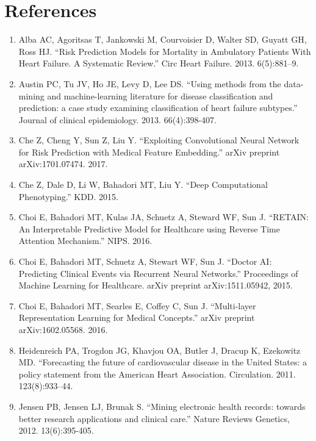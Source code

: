 \documentclass[11pt]{article}
\begin{document}
	\section{References}
	\label{sec:references}
	\begin{enumerate}
		\item Alba AC, Agoritsas T, Jankowski M, Courvoisier D, Walter SD, Guyatt GH, Ross HJ. “Risk Prediction Models for Mortality in Ambulatory Patients With Heart Failure. A Systematic Review.” Circ Heart Failure. 2013. 6(5):881–9.
		
		\item Austin PC, Tu JV, Ho JE, Levy D, Lee DS. “Using methods from the data-mining and machine-learning literature for disease classification and prediction: a case study examining classification of heart failure subtypes.” Journal of clinical epidemiology. 2013. 66(4):398-407.
		
		\item Che Z, Cheng Y, Sun Z, Liu Y. “Exploiting Convolutional Neural Network for Risk Prediction with Medical Feature Embedding.” arXiv preprint arXiv:1701.07474. 2017.
		
		\item Che Z, Dale D, Li W, Bahadori MT, Liu Y. “Deep Computational Phenotyping.” KDD. 2015.
		
		\item Choi E, Bahadori MT, Kulas JA, Schuetz A, Steward WF, Sun J. “RETAIN: An Interpretable Predictive Model for Healthcare using Reverse Time Attention Mechanism.” NIPS. 2016.
		
		\item Choi E, Bahadori MT, Schuetz A, Stewart WF, Sun J. “Doctor AI: Predicting Clinical Events via Recurrent Neural Networks.” Proceedings of Machine Learning for Healthcare. arXiv preprint arXiv:1511.05942, 2015.
		
		\item Choi E, Bahadori MT, Searles E, Coffey C, Sun J. “Multi-layer Representation Learning for Medical Concepts.” arXiv preprint arXiv:1602.05568. 2016.
		
		\item Heidenreich PA, Trogdon JG, Khavjou OA, Butler J, Dracup K, Ezekowitz MD. “Forecasting the future of cardiovascular disease in the United States: a policy statement from the American Heart Association. Circulation. 2011. 123(8):933–44.
		
		\item Jensen PB, Jensen LJ, Brunak S. “Mining electronic health records: towards better research applications and clinical care.” Nature Reviews Genetics, 2012. 13(6):395-405.
		

\end{enumerate}
\end{document}
